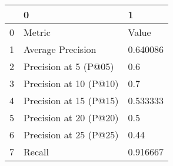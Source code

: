 \begin{tabular}{lll}
\toprule
{} &                       0 &         1 \\
\midrule
0 &                  Metric &     Value \\
1 &       Average Precision &  0.640086 \\
2 &   Precision at 5 (P@05) &       0.6 \\
3 &  Precision at 10 (P@10) &       0.7 \\
4 &  Precision at 15 (P@15) &  0.533333 \\
5 &  Precision at 20 (P@20) &       0.5 \\
6 &  Precision at 25 (P@25) &      0.44 \\
7 &                  Recall &  0.916667 \\
\bottomrule
\end{tabular}
